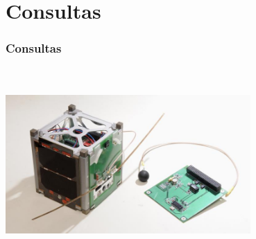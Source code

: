 \documentclass[xcolor=dvipsnames]{beamer}
\begin{document}
    \section{Consultas}
    \begin{frame}
        \frametitle{Consultas}
        \centering
        \Large {}\\
        
        \normalsize {}\\
        
        \vspace{1cm}
        \includegraphics[width=0.7\textwidth]{img/suchai_satellite.jpg}
    \end{frame}
    
\end{document}

